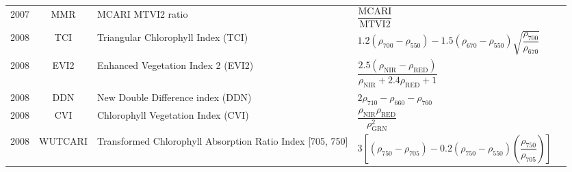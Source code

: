 \documentclass[10pt]{article}
\begin{document}
\begin{ThreePartTable}
\begin{longtable}{c c m{2.80in} M{2.80in} M{1.5in}}
  2007 & MMR     & MCARI MTVI2 ratio                                                              & $\dfrac{\text{MCARI}}{\text{MTVI2}}$                                                                                                                                                                                                                                                    & \citet{Eitel2007}                                   \\
  2008 & TCI     & Triangular Chlorophyll Index (TCI)                                             & $1.2(\rho_{700}-\rho_{550})-1.5(\rho_{670}-\rho_{550})\sqrt{\dfrac{\rho_{700}}{\rho_{670}}}$                                                                                                                                                                                            & \citet{Haboudane2008}                               \\
  2008 & EVI2    & Enhanced Vegetation Index 2 (EVI2)                                             & $\dfrac{2.5(\rho_\text{NIR}-\rho_\text{RED})}{\rho_\text{NIR}+2.4\rho_\text{RED}+1}$                                                                                                                                                                                                    & \citet{Jiang2008}                                   \\
  2008 & DDN     & New Double Difference index (DDN)                                              & $2\rho_{710}-\rho_{660}-\rho_{760}$                                                                                                                                                                                                                                                     & \citet{LeMaire2008}                                 \\
  2008 & CVI     & Chlorophyll Vegetation Index (CVI)                                             & $\dfrac{\rho_\text{NIR}\rho_\text{RED}}{\rho^2_\text{GRN}}$                                                                                                                                                                                                                             & \citet{Vincini2008}                                 \\
  2008 & WUTCARI & Transformed Chlorophyll Absorption Ratio Index [705, 750]                      & $3\left[(\rho_{750}-\rho_{705})-0.2(\rho_{750}-\rho_{550})\left(\dfrac{\rho_{750}}{\rho_{705}}\right)\right]$                                                                                                                                                                           & \citet{Wu2008}                                      \\

\end{longtable}
\end{ThreePartTable}
\end{document}
